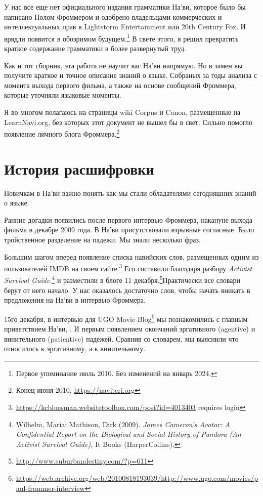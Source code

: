 
У нас все еще нет официального издания грамматики На'ви, которое было бы написано Полом Фроммером и одобрено владельцами коммерческих и интеллектуальных прав в Lightstorm Entertainment или 20th Century Fox. И врядли появится в обозримом будущем.\footnote{Первое упоминание июль 2010.  Без изменений на январь
2024.} В свете этого, я решил превратить краткое содержание грамматики в более развернутый труд.

Как и тот сборник, эта работа не научит вас На'ви напрямую.
Но в замен вы получите краткое и точное описание знаний о языке. Собраных за годы анализа с момента выхода первого фильма, а также на  основе сообщений Фроммера, которые уточняли языковые моменты.

Я во многом полагаюсь на страницы wiki Corpus и Canon, размещенные на LearnNavi.org,
без которых этот документ не вышел бы в свет. Сильно помогло появление личного блога Фроммера.\footnote{Конец июня 2010, \url{https://naviteri.org}}


\section{История расшифровки}
Новичкам в На'ви важно понять как мы стали обладателями сегодняшних знаний о языке.

Ранние догадки появились после первого интервью Фроммера, накануне выхода фильма в декабре 2009 года. В На'ви присутствовали взрывные согласные. Было тройственное разделение на падежи. Мы знали несколько фраз.

Большим шагом вперед появление списка навийских слов, размещенных одним из пользователей IMDB на своем сайте.\footnote{\url{https://kcbluesman.websitetoolbox.com/post?id=4013403}
requires login}  Его составили благодаря разбору \textit{Activist
Survival Guide}.\footnote{Wilhelm, Maria; Mathison, Dirk (2009). \textit{James
Cameron's Avatar: A Confidential Report on the Biological and Social
History of Pandora (An Activist Survival Guide),} It Books (HarperCollins).}
и разместили в блоге 11 декабря.\footnote{\url{http://www.suburbandestiny.com/?p=611}}Практически все словари берут от него начало.  У нас оказалось достаточно слов, чтобы начать вникать в предложения на На'ви в интервью Фроммера.

15го декабря, в интервью для UGO Movie
Blog\footnote{\url{https://web.archive.org/web/20100818193039/http://www.ugo.com/movies/paul-frommer-interview}}
мы познакомились с главным приветствием На'ви,  .  И первым появлением окончаний эргативного (agentive) и винительного (patientive) падежей.  Сравнив со словарем, мы выяснили что  относилось к эргативному, а  к винительному.

